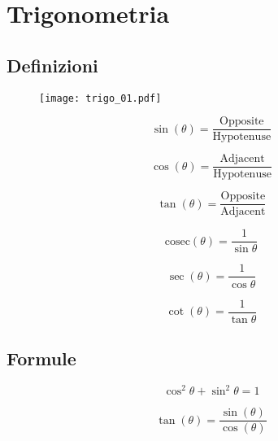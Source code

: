 \section{Trigonometria}\label{subsec:ss_trigo}

\subsection{Definizioni}

\begin{figure}[H]
\centering
\texttt{[image: trigo\_01.pdf]}
\end{figure}


\begin{equation}
\sin(\theta)=\frac{
\textrm{Opposite}
}{
\textrm{Hypotenuse}
}
\end{equation}

\begin{equation}
\cos(\theta)=\frac{
\textrm{Adjacent}
}{
\textrm{Hypotenuse}
}
\end{equation}

\begin{equation}
\tan(\theta)=\frac{
\textrm{Opposite}
}{
\textrm{Adjacent}
}
\end{equation}

\begin{equation}
\mathrm{cosec }(\theta)=\frac{
1
}{
\sin{\theta}
}
\end{equation}


\begin{equation}
\sec(\theta)=\frac{
1
}{
\cos{\theta}
}
\end{equation}


\begin{equation}
\cot(\theta)=\frac{
1
}{
\tan{\theta}
}
\end{equation}



\setcounter{equation}{0}

\subsection{Formule}

\begin{equation}
\cos^2\theta+\sin^2\theta=1
\end{equation}

\begin{equation}
\tan(\theta)=\frac{\sin(\theta)}{\cos(\theta)}
\end{equation}

